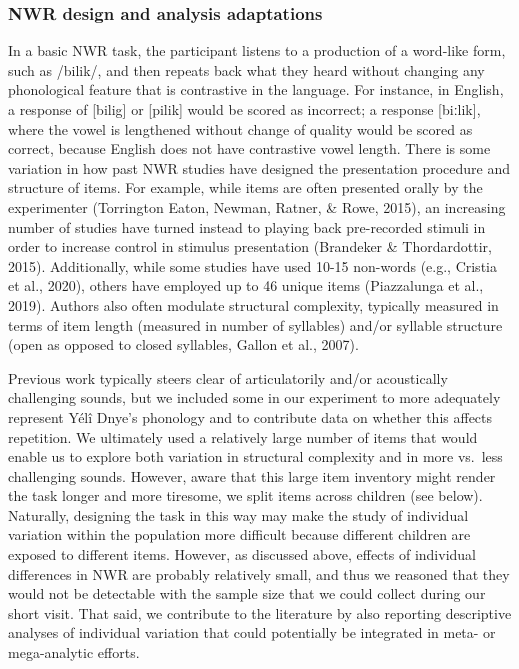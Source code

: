 \documentclass[english,,man,floatsintext]{apa6}
\begin{document}
\hypertarget{nwr-design-and-analysis-adaptations}{%
\subsubsection{NWR design and analysis adaptations}\label{nwr-design-and-analysis-adaptations}}

In a basic NWR task, the participant listens to a production of a word-like form, such as /bilik/, and then repeats back what they heard without changing any phonological feature that is contrastive in the language. For instance, in English, a response of {[}bilig{]} or {[}pilik{]} would be scored as incorrect; a response {[}biːlik{]}, where the vowel is lengthened without change of quality would be scored as correct, because English does not have contrastive vowel length. There is some variation in how past NWR studies have designed the presentation procedure and structure of items. For example, while items are often presented orally by the experimenter (Torrington Eaton, Newman, Ratner, \& Rowe, 2015), an increasing number of studies have turned instead to playing back pre-recorded stimuli in order to increase control in stimulus presentation (Brandeker \& Thordardottir, 2015). Additionally, while some studies have used 10-15 non-words (e.g., Cristia et al., 2020), others have employed up to 46 unique items (Piazzalunga et al., 2019). Authors also often modulate structural complexity, typically measured in terms of item length (measured in number of syllables) and/or syllable structure (open as opposed to closed syllables, Gallon et al., 2007).

Previous work typically steers clear of articulatorily and/or acoustically challenging sounds, but we included some in our experiment to more adequately represent Yélî Dnye's phonology and to contribute data on whether this affects repetition. We ultimately used a relatively large number of items that would enable us to explore both variation in structural complexity and in more vs.~less challenging sounds. However, aware that this large item inventory might render the task longer and more tiresome, we split items across children (see below). Naturally, designing the task in this way may make the study of individual variation within the population more difficult because different children are exposed to different items. However, as discussed above, effects of individual differences in NWR are probably relatively small, and thus we reasoned that they would not be detectable with the sample size that we could collect during our short visit. That said, we contribute to the literature by also reporting descriptive analyses of individual variation that could potentially be integrated in meta- or mega-analytic efforts.
\end{document}
